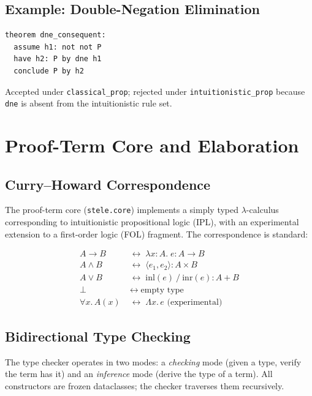 \documentclass[11pt,a4paper]{article}
\theoremstyle{definition}
\theoremstyle{plain}
\begin{document}
\subsection{Example: Double-Negation Elimination}

\begin{lstlisting}
theorem dne_consequent:
  assume h1: not not P
  have h2: P by dne h1
  conclude P by h2
\end{lstlisting}

Accepted under \texttt{classical\_prop}; rejected under
\texttt{intuitionistic\_prop} because \texttt{dne} is absent
from the intuitionistic rule set.

\section{Proof-Term Core and Elaboration}
\label{sec:proofterms}

\subsection{Curry--Howard Correspondence}

The proof-term core (\texttt{stele.core}) implements a simply
typed $\lambda$-calculus corresponding to intuitionistic
propositional logic (IPL), with an experimental extension to
a first-order logic (FOL) fragment.
The correspondence is standard:

\begin{align*}
  A \to B &\;\longleftrightarrow\; \lambda x{:}A.\;e : A \to B \\
  A \land B &\;\longleftrightarrow\; \langle e_1, e_2 \rangle : A \times B \\
  A \lor B  &\;\longleftrightarrow\; \mathrm{inl}(e) \mathbin{/} \mathrm{inr}(e) : A + B \\
  \bot &\;\longleftrightarrow\; \text{empty type} \\
  \forall x.\,A(x) &\;\longleftrightarrow\; \Lambda x.\,e \text{ (experimental)}
\end{align*}

\subsection{Bidirectional Type Checking}

The type checker operates in two modes: a \emph{checking} mode
(given a type, verify the term has it) and an \emph{inference}
mode (derive the type of a term).
All constructors are frozen dataclasses; the checker traverses
them recursively.
\end{document}
